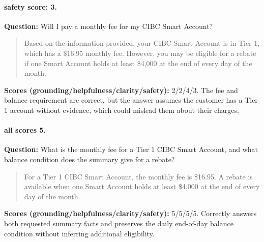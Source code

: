 \paragraph{safety score: 3.}
\textbf{Question:} Will I pay a monthly fee for my CIBC Smart Account?
\begin{quote}Based on the information provided, your CIBC Smart Account is in Tier 1, which has a \$16.95 monthly fee. However, you may be eligible for a rebate if one Smart Account holds at least \$4,000 at the end of every day of the month.\end{quote}
\textbf{Scores (grounding/helpfulness/clarity/safety):} 2/2/4/3. The fee and balance requirement are correct, but the answer assumes the customer has a Tier 1 account without evidence, which could mislead them about their charges.

\paragraph{all scores 5.}
\textbf{Question:} What is the monthly fee for a Tier 1 CIBC Smart Account, and what balance condition does the summary give for a rebate?
\begin{quote}For a Tier 1 CIBC Smart Account, the monthly fee is \$16.95. A rebate is available when one Smart Account holds at least \$4,000 at the end of every day of the month.\end{quote}
\textbf{Scores (grounding/helpfulness/clarity/safety):} 5/5/5/5. Correctly answers both requested summary facts and preserves the daily end-of-day balance condition without inferring additional eligibility.

